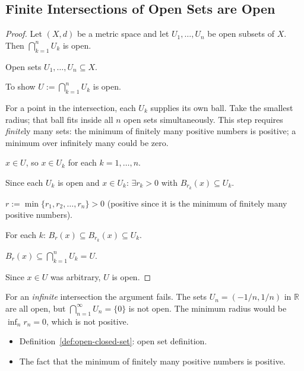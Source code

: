 
\subsection*{Finite Intersections of Open Sets are Open}
\label{prf:finite-intersection-open}

\begin{proof}
\Claim Let $(X,d)$ be a metric space and let $U_1, \dots, U_n$ be open subsets of $X$.
Then $\bigcap_{k=1}^{n} U_k$ is open.

\Given Open sets $U_1, \dots, U_n \subseteq X$.

\Goal To show $U := \bigcap_{k=1}^{n} U_k$ is open.

\Strategy For a point in the intersection, each $U_k$ supplies its own ball.
Take the smallest radius; that ball fits inside all $n$ open sets simultaneously.
This step requires \emph{finite}ly many sets: the minimum of finitely many positive
numbers is positive; a minimum over infinitely many could be zero.

\medskip
\Let $x \in U$, so $x \in U_k$ for each $k = 1, \dots, n$.

Since each $U_k$ is open and $x \in U_k$: $\exists r_k > 0$ with $B_{r_k}(x) \subseteq U_k$.

\Let $r := \min\{r_1, r_2, \dots, r_n\} > 0$ (positive since it is the minimum of finitely many positive numbers).

For each $k$: $B_r(x) \subseteq B_{r_k}(x) \subseteq U_k$.

\Therefore $B_r(x) \subseteq \bigcap_{k=1}^n U_k = U$.

Since $x \in U$ was arbitrary, $U$ is open. \AsReq
\end{proof}

\begin{remark*}
For an \emph{infinite} intersection the argument fails.
The sets $U_n = (-1/n, 1/n)$ in $\mathbb{R}$ are all open, but
$\bigcap_{n=1}^\infty U_n = \{0\}$ is not open.
The minimum radius would be $\inf_n r_n = 0$, which is not positive.
\end{remark*}

\begin{remark*}[Dependencies]
\begin{itemize}
  \item Definition~\ref{def:open-closed-set}: open set definition.
  \item The fact that the minimum of finitely many positive numbers is positive.
\end{itemize}
\end{remark*}
